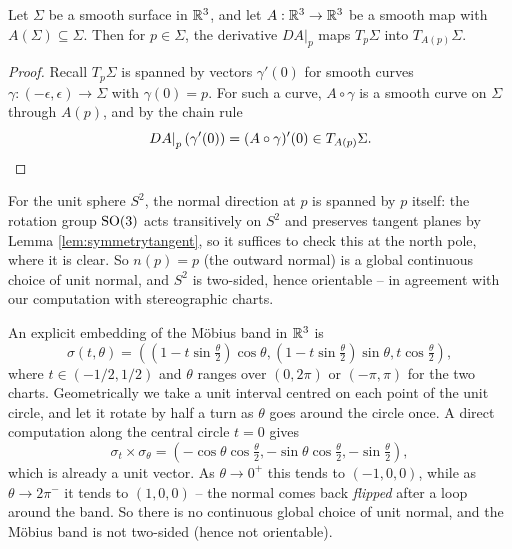 \documentclass[a4paper]{scrartcl}
\begin{document}
\begin{lemma}\label{lem:symmetrytangent}
    Let $\Sigma$ be a smooth surface in $\mathbb{R}^3$, and let $A: \mathbb{R}^3 \rightarrow \mathbb{R}^3$ be a smooth map with $A(\Sigma) \subseteq \Sigma$. Then for $p \in \Sigma$, the derivative $\left.DA\right|_p$ maps $T_p \Sigma$ into $T_{A(p)} \Sigma$.
\end{lemma}
\begin{proof}
    Recall $T_p\Sigma$ is spanned by vectors $\gamma'(0)$ for smooth curves $\gamma: (-\epsilon, \epsilon) \rightarrow \Sigma$ with $\gamma(0) = p$. For such a curve, $A \circ \gamma$ is a smooth curve on $\Sigma$ through $A(p)$, and by the chain rule
    $$
    \left.DA\right|_p (\gamma'(0)) = (A \circ \gamma)'(0) \in T_{A(p)} \Sigma. \qedhere
    $$
\end{proof}

\begin{example}
    For the unit sphere $S^2$, the normal direction at $p$ is spanned by $p$ itself: the rotation group $\operatorname{SO}(3)$ acts transitively on $S^2$ and preserves tangent planes by Lemma \ref{lem:symmetrytangent}, so it suffices to check this at the north pole, where it is clear. So $n(p) = p$ (the outward normal) is a global continuous choice of unit normal, and $S^2$ is two-sided, hence orientable -- in agreement with our computation with stereographic charts.
\end{example}

\begin{example}
    An explicit embedding of the M\"obius band in $\mathbb{R}^3$ is
    $$
    \sigma(t, \theta) = \left(\left(1 - t \sin \tfrac{\theta}{2}\right) \cos\theta, \left(1 - t \sin \tfrac{\theta}{2}\right) \sin\theta, t \cos\tfrac{\theta}{2}\right),
    $$
    where $t \in (-1/2, 1/2)$ and $\theta$ ranges over $(0, 2\pi)$ or $(-\pi, \pi)$ for the two charts. Geometrically we take a unit interval centred on each point of the unit circle, and let it rotate by half a turn as $\theta$ goes around the circle once. A direct computation along the central circle $t = 0$ gives
    $$
    \sigma_t \times \sigma_\theta = \left(-\cos\theta\cos\tfrac{\theta}{2}, -\sin\theta\cos\tfrac{\theta}{2}, -\sin\tfrac{\theta}{2}\right),
    $$
    which is already a unit vector. As $\theta \rightarrow 0^+$ this tends to $(-1, 0, 0)$, while as $\theta \rightarrow 2\pi^-$ it tends to $(1, 0, 0)$ -- the normal comes back \emph{flipped} after a loop around the band. So there is no continuous global choice of unit normal, and the M\"obius band is not two-sided (hence not orientable).
\end{example}
\end{document}

